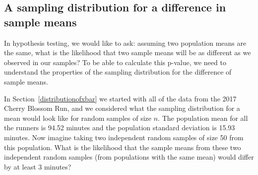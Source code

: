 

\D{\newpage}

\subsection{A sampling distribution for a difference in sample means} 

In hypothesis testing, we would like to ask:  assuming two population means are the same, what is the likelihood that two sample means will be as different as we observed in our samples?  To be able to calculate this p-value, we need to understand the properties of the sampling distribution for the difference of sample means.

In Section~\ref{distributionofxbar} we started with all of the data from the 2017 Cherry Blossom Run, and we considered what the sampling distribution for a mean would look like for random samples of size $n$.  The population mean for all the runners is 94.52 minutes and the population standard deviation is 15.93 minutes.  Now imagine taking two independent random samples of size 50 from this population.  What is the likelihood that the sample means from these two independent random samples (from populations with the same mean) would differ by at least 3 minutes?

